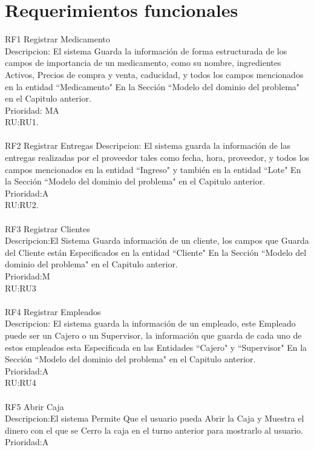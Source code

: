 \section{Requerimientos funcionales}
RF1 Registrar Medicamento\\
Descripcion: El sistema Guarda la información de forma estructurada de los campos de importancia de un medicamento, como su nombre, ingredientes Activos, Precios de compra y venta, caducidad, y todos los campos mencionados en la entidad ``Medicamento" En la Sección ``Modelo del dominio del problema" en el  Capitulo anterior.\\
Prioridad: MA\\
RU:RU1.\\
\\
RF2 Registrar Entregas 
Descripcion: El sistema guarda la información de las entregas realizadas por el proveedor tales como fecha, hora, proveedor, y todos los campos mencionados en la entidad ``Ingreso" y también en la entidad ``Lote" En la Sección ``Modelo del dominio del problema" en el  Capitulo anterior.\\
Prioridad:A\\
RU:RU2.\\
\\
RF3 Registrar Clientes\\
Descripcion:El Sistema Guarda información de un cliente, los campos que Guarda del Cliente están Especificados en la entidad ``Cliente" En la Sección ``Modelo del dominio del problema" en el  Capitulo anterior.\\
Prioridad:M\\
RU:RU3\\
\\
RF4 Registrar Empleados\\
Descripcion: El sistema guarda la información de un empleado, este Empleado puede ser un Cajero o un Supervisor, la información que guarda de cada uno de estos empleados esta Especificada en las Entidades ``Cajero" y ``Supervisor" En la Sección ``Modelo del dominio del problema" en el  Capitulo anterior.\\
Prioridad:A\\
RU:RU4\\
\\
RF5 Abrir Caja\\
Descripcion:El sistema Permite Que el usuario pueda Abrir la Caja y Muestra el dinero con el que se Cerro la caja en el turno anterior para mostrarlo al usuario.
\\
Prioridad:A\\
